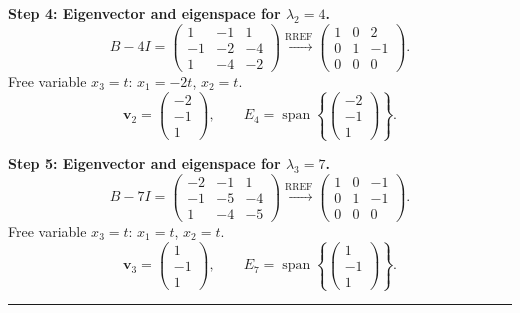 \documentclass[12pt,a3paper]{article}
\begin{document}
\begin{tcolorbox}
\textbf{Step 4: Eigenvector and eigenspace for $\lambda_2=4$.}
\[
  B-4I = \begin{pmatrix}1&-1&1\\-1&-2&-4\\1&-4&-2\end{pmatrix}
  \xrightarrow{\text{RREF}}
  \begin{pmatrix}1&0&2\\0&1&-1\\0&0&0\end{pmatrix}.
\]
Free variable $x_3=t$: $x_1=-2t$, $x_2=t$.
\[
  \mathbf{v}_2=\begin{pmatrix}-2\\-1\\1\end{pmatrix}, \qquad
  E_4=\operatorname{span}\!\left\{\begin{pmatrix}-2\\-1\\1\end{pmatrix}\right\}.
\]

\textbf{Step 5: Eigenvector and eigenspace for $\lambda_3=7$.}
\[
  B-7I = \begin{pmatrix}-2&-1&1\\-1&-5&-4\\1&-4&-5\end{pmatrix}
  \xrightarrow{\text{RREF}}
  \begin{pmatrix}1&0&-1\\0&1&-1\\0&0&0\end{pmatrix}.
\]
Free variable $x_3=t$: $x_1=t$, $x_2=t$.
\[
  \mathbf{v}_3=\begin{pmatrix}1\\-1\\1\end{pmatrix}, \qquad
  E_7=\operatorname{span}\!\left\{\begin{pmatrix}1\\-1\\1\end{pmatrix}\right\}.
\]

\medskip\textcolor{cE}{\rule{\textwidth}{0.4pt}}


\end{tcolorbox}
\end{document}
